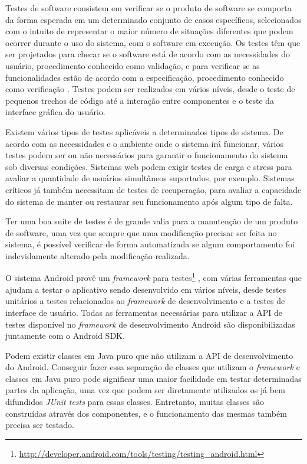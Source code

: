 \begin{apendicesenv}
Testes de software consistem em verificar se o produto de software se comporta da forma esperada em um determinado conjunto de casos específicos, selecionados com o intuito de representar o maior número de situações diferentes que podem ocorrer durante o uso do sistema, com o software em execução. Os testes têm que ser projetados para checar se o software está de acordo com as necessidades do usuário, procedimento conhecido como validação, e para verificar se as funcionalidades estão de acordo com a especificação, procedimento conhecido como verificação \cite{swebok}. Testes podem ser realizados em vários níveis, desde o teste de pequenos trechos de código até a interação entre componentes e o teste da interface gráfica do usuário.

Existem vários tipos de testes aplicáveis a determinados tipos de sistema. De acordo com as necessidades e o ambiente onde o sistema irá funcionar, vários testes podem ser ou não necessários para garantir o funcionamento do sistema sob diversas condições. Sistemas web podem exigir testes de carga e stress para avaliar a quantidade de usuários simultâneos suportados, por exemplo. Sistemas críticos já também necessitam de testes de recuperação, para avaliar a capacidade do sistema de manter ou restaurar seu funcionamento após algum tipo de falta.

Ter uma boa suíte de testes é de grande valia para a manutenção de um produto de software, uma vez que sempre que uma modificação precisar ser feita no sistema, é possível verificar de forma automatizada se algum comportamento foi indevidamente alterado pela modificação realizada.

O sistema Android provê um \textit{framework} para testes\footnote{\url{http://developer.android.com/tools/testing/testing\_android.html}} , com várias ferramentas que ajudam a testar o aplicativo sendo desenvolvido em vários níveis, desde testes unitários a testes relacionados ao \textit{framework} de desenvolvimento e a testes de interface de usuário. Todas as ferramentas necessárias para utilizar a API de testes disponível no \textit{framework} de desenvolvimento Android são disponibilizadas juntamente com o Android SDK.

Podem existir classes em Java puro que não utilizam a API de desenvolvimento do Android. Conseguir fazer essa separação de classes que utilizam o \textit{framework} e classes em Java puro pode significar uma maior facilidade em testar determinadas partes da aplicação, uma vez que podem ser diretamente utilizados os já bem difundidos \textit{JUnit tests} para essas classes. Entretanto, muitas classes são construídas através dos componentes, e o funcionamento das mesmas também precisa ser testado.


\end{apendicesenv}
